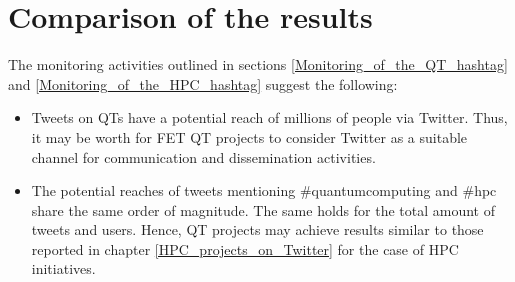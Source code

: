 \section{Comparison of the results} \label{Comparison_of_the_results}
The monitoring activities outlined in sections \ref{Monitoring_of_the_QT_hashtag} and \ref{Monitoring_of_the_HPC_hashtag} suggest the following:

\begin{itemize}
 \item Tweets on QTs have a potential reach of millions of people via Twitter. Thus, it may be worth for FET QT projects to consider Twitter as a suitable channel for communication and dissemination activities.
 \item The potential reaches of tweets mentioning \#quantumcomputing and \#hpc share the same order of magnitude. The same holds for the total amount of tweets and users. Hence, QT projects may achieve results similar to those reported in chapter \ref{HPC_projects_on_Twitter} for the case of HPC initiatives. 
\end{itemize}

